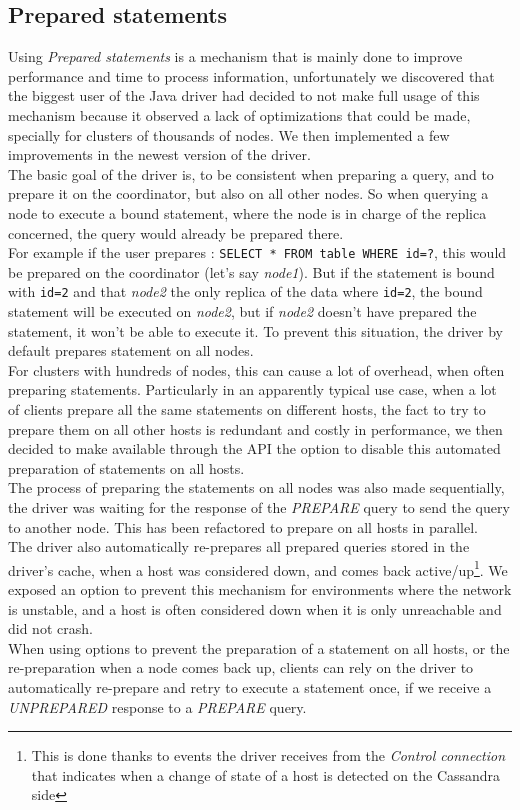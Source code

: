 \documentclass[a4paper]{report}
\begin{document}
\subsection{Prepared statements}
Using \emph{Prepared statements} is a mechanism that is mainly done to improve performance and time to process information, unfortunately we discovered that the biggest user of the Java driver had decided to not make full usage of this mechanism because it observed a lack of optimizations that could be made, specially for clusters of thousands of nodes. We then implemented a few improvements in the newest version of the driver.\\
The basic goal of the driver is, to be consistent when preparing a query, and to prepare it on the coordinator, but also on all other nodes. So when querying a node to execute a bound statement, where the node is in charge of the replica concerned, the query would already be prepared there. \\
For example if the user prepares : \verb;SELECT * FROM table WHERE id=?;, this would be prepared on the coordinator (let's say \emph{node1}). But if the statement is bound with \verb;id=2; and that \emph{node2} the only replica of the data where \verb;id=2;, the bound statement will be executed on \emph{node2}, but if \emph{node2} doesn't have prepared the statement, it won't be able to execute it. To prevent this situation, the driver by default prepares statement on all nodes.\\
For clusters with hundreds of nodes, this can cause a lot of overhead, when often preparing statements. Particularly in an apparently typical use case, when a lot of clients prepare all the same statements on different hosts, the fact to try to prepare them on all other hosts is redundant and costly in performance, we then decided to make available through the API the option to disable this automated preparation of statements on all hosts. \\
The process of preparing the statements on all nodes was also made sequentially, the driver was waiting for the response of the \emph{PREPARE} query to send the query to another node. This has been refactored to prepare on all hosts in parallel.\\
The driver also automatically re-prepares all prepared queries stored in the driver's cache, when a host was considered down, and comes back active/up\footnote{This is done thanks to events the driver receives from the \emph{Control connection} that indicates when a change of state of a host is detected on the Cassandra side}. We exposed an option to prevent this mechanism for environments where the network is unstable, and a host is often considered down when it is only unreachable and did not crash.\\
When using options to prevent the preparation of a statement on all hosts, or the re-preparation when a node comes back up, clients can rely on the driver to automatically re-prepare and retry to execute a statement once, if we receive a \emph{UNPREPARED} response to a \emph{PREPARE} query.
\end{document}
